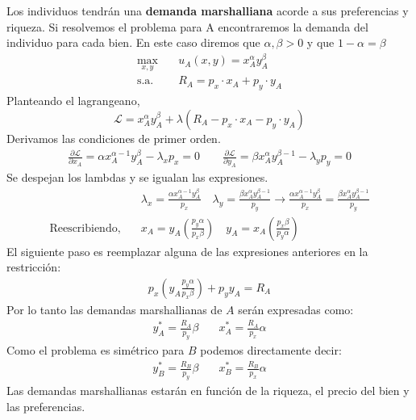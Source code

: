 Los individuos tendrán una \textbf{demanda marshalliana} acorde a sus preferencias y riqueza. Si resolvemos el problema para A encontraremos la demanda del individuo para cada bien. En este caso diremos que $\alpha,\beta >0$ y que $1 - \alpha = \beta $
\begin{align*}
    \max_{x,y} &\quad u_A(x,y) = x_A^\alpha y_A^{\beta}\quad \\
    \text{s.a.} &\quad R_A = p_x \cdot x_A + p_y \cdot y_A
\end{align*}
Planteando el lagrangeano,
\begin{equation*}
    \mathcal{L}= x_A^\alpha y_A^{\beta} + \lambda (R_A - p_x \cdot x_A - p_y \cdot y_A)
\end{equation*}
Derivamos las condiciones de primer orden.
\begin{align*}
    \frac{\partial \mathcal{L}}{\partial x_A} = \alpha x_A^{\alpha-1}y_A^\beta - \lambda_x p_x = 0 \quad \quad
    \frac{\partial \mathcal{L}}{\partial y_A} = \beta x_A^\alpha y_A^{\beta -1} - \lambda_y p_y = 0
\end{align*}
Se despejan los lambdas y se igualan las expresiones.
\begin{align*}
    & \lambda_x = \frac{\alpha x_A^{\alpha-1}y_A^\beta }{p_x} \quad 
    \lambda_y = \frac{\beta x_A^\alpha y_A^{\beta-1}}{p_y} \longrightarrow \frac{\alpha x_A^{\alpha-1}y_A^\beta }{p_x} = \frac{\beta x_A^\alpha y_A^{\beta-1}}{p_y} \\
    \text{Reescribiendo,}\quad & x_A = y_A  \left( \frac{p_y \alpha}{p_x \beta} \right)  \quad y_A = x_A \left(  \frac{p_x \beta}{p_y\alpha}  \right)
\end{align*}
El siguiente paso es reemplazar alguna de las expresiones anteriores en la restricción:
\begin{align*}
    p_x\left( y_A\frac{p_y\alpha}{p_x\beta} \right) + p_yy_A = R_A
\end{align*}
Por lo tanto las demandas marshallianas de $A$ serán expresadas como:
\begin{align*}
    y_A^* = \frac{R_A}{p_y} \beta & \quad  x_A^* = \frac{R_A}{p_x} \alpha
\end{align*}
Como el problema es simétrico para $B$ podemos directamente decir:
\begin{align*}
    y_B^* = \frac{R_B}{p_y} \beta & \quad  x_B^* = \frac{R_B}{p_x} \alpha
\end{align*}
Las demandas marshallianas estarán en función de la riqueza, el precio del bien y las preferencias.

